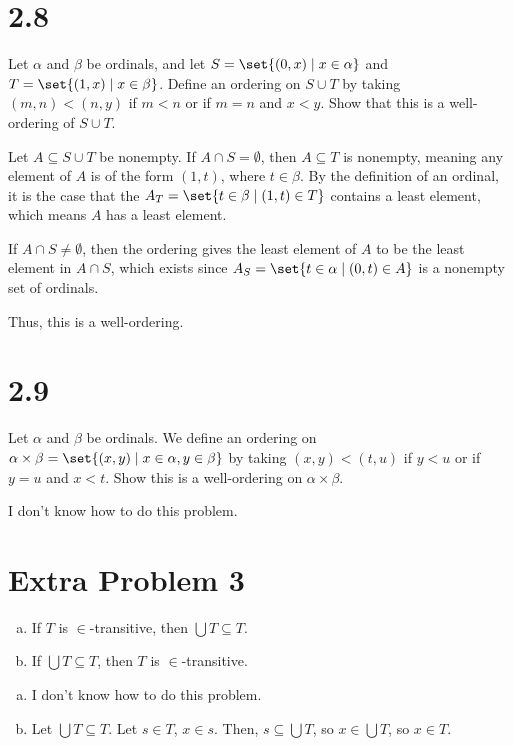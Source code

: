 \documentclass[10pt]{mypackage}
\begin{document}
\section{2.8}%
\begin{problem}
  Let $\alpha$ and $\beta$ be ordinals, and let $S = \set{(0,x)\mid x\in \alpha}$ and $T = \set{(1,x)\mid x\in \beta}$. Define an ordering on $S\cup T$ by taking $(m,n) < (n,y)$ if $m < n$ or if $m = n$ and $x < y$. Show that this is a well-ordering of $S\cup T$.
\end{problem}
\begin{solution}
  Let $A\subseteq S\cup T$ be nonempty. If $A\cap S = \emptyset$, then $A \subseteq T$ is nonempty, meaning any element of $A$ is of the form $(1,t)$, where $t\in \beta$. By the definition of an ordinal, it is the case that the $A_T = \set{t\in \beta\mid (1,t)\in T}$ contains a least element, which means $A$ has a least element.\newline

  If $A\cap S \neq \emptyset$, then the ordering gives the least element of $A$ to be the least element in $A\cap S$, which exists since $A_S = \set{t\in \alpha\mid (0,t)\in A}$ is a nonempty set of ordinals.\newline

  Thus, this is a well-ordering.
\end{solution}
\section{2.9}%
\begin{problem}
  Let $\alpha$ and $\beta$ be ordinals. We define an ordering on $\alpha \times \beta = \set{(x,y)\mid x\in \alpha,y\in\beta}$ by taking $(x,y) < (t,u)$ if $y < u$ or if $y = u$ and $x < t$. Show this is a well-ordering on $\alpha \times \beta$.
\end{problem}
\begin{solution}
  I don't know how to do this problem.
\end{solution}
\section{Extra Problem 3}%
\begin{problem}\hfill
  \begin{enumerate}[(a)]
    \item If $T$ is $\in$-transitive, then $\bigcup T \subseteq T$.
    \item If $\bigcup T \subseteq T$, then $T$ is $\in$-transitive.
  \end{enumerate}
\end{problem}
\begin{solution}\hfill
  \begin{enumerate}[(a)]
    \item I don't know how to do this problem.
    \item Let $\bigcup T\subseteq T$. Let $s\in T$, $x\in s$. Then, $s\subseteq \bigcup T$, so $x\in \bigcup T$, so $x\in T$.
  \end{enumerate}
\end{solution}
\end{document}
